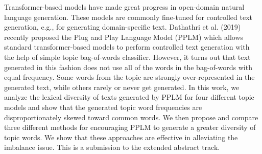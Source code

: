 Transformer-based models have made great progress in open-domain natural language generation. These models are commonly fine-tuned for controlled text generation, e.g., for generating domain-specific text. Dathathri et al. (2019) recently proposed the Plug and Play Language Model (PPLM) which allows standard transformer-based models to perform controlled text generation with the help of simple topic bag-of-words classifier. However, it turns out that text generated in this fashion does not use all of the words in the bag-of-words with equal frequency. Some words from the topic are strongly over-represented in the generated text, while others rarely or never get generated. In this work, we analyze the lexical diversity of texts generated by PPLM for four different topic models and show that the generated topic word frequencies are disproportionately skewed toward common words. We then propose and compare three different methods for encouraging PPLM to generate a greater diversity of topic words. We show that these approaches are effective in alleviating the imbalance issue. This is a submission to the extended abstract track.
